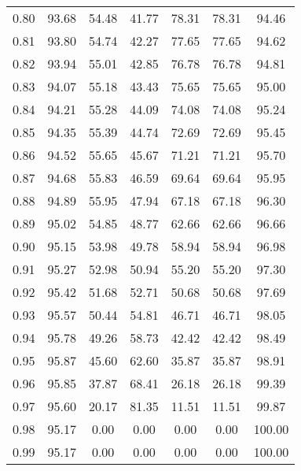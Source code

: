 \begin{tabular}{|c|c|c|c|c|c|c|}
      0.80 &     93.68 &     54.48 &      41.77 &   78.31 &      78.31 &         94.46 \\
      0.81 &     93.80 &     54.74 &      42.27 &   77.65 &      77.65 &         94.62 \\
      0.82 &     93.94 &     55.01 &      42.85 &   76.78 &      76.78 &         94.81 \\
      0.83 &     94.07 &     55.18 &      43.43 &   75.65 &      75.65 &         95.00 \\
      0.84 &     94.21 &     55.28 &      44.09 &   74.08 &      74.08 &         95.24 \\
      0.85 &     94.35 &     55.39 &      44.74 &   72.69 &      72.69 &         95.45 \\
      0.86 &     94.52 &     55.65 &      45.67 &   71.21 &      71.21 &         95.70 \\
      0.87 &     94.68 &     55.83 &      46.59 &   69.64 &      69.64 &         95.95 \\
      0.88 &     94.89 &     55.95 &      47.94 &   67.18 &      67.18 &         96.30 \\
      0.89 &     95.02 &     54.85 &      48.77 &   62.66 &      62.66 &         96.66 \\
      0.90 &     95.15 &     53.98 &      49.78 &   58.94 &      58.94 &         96.98 \\
      0.91 &     95.27 &     52.98 &      50.94 &   55.20 &      55.20 &         97.30 \\
      0.92 &     95.42 &     51.68 &      52.71 &   50.68 &      50.68 &         97.69 \\
      0.93 &     95.57 &     50.44 &      54.81 &   46.71 &      46.71 &         98.05 \\
      0.94 &     95.78 &     49.26 &      58.73 &   42.42 &      42.42 &         98.49 \\
      0.95 &     95.87 &     45.60 &      62.60 &   35.87 &      35.87 &         98.91 \\
      0.96 &     95.85 &     37.87 &      68.41 &   26.18 &      26.18 &         99.39 \\
      0.97 &     95.60 &     20.17 &      81.35 &   11.51 &      11.51 &         99.87 \\
      0.98 &     95.17 &      0.00 &       0.00 &    0.00 &       0.00 &        100.00 \\
      0.99 &     95.17 &      0.00 &       0.00 &    0.00 &       0.00 &        100.00 \\
\bottomrule
\end{tabular}
